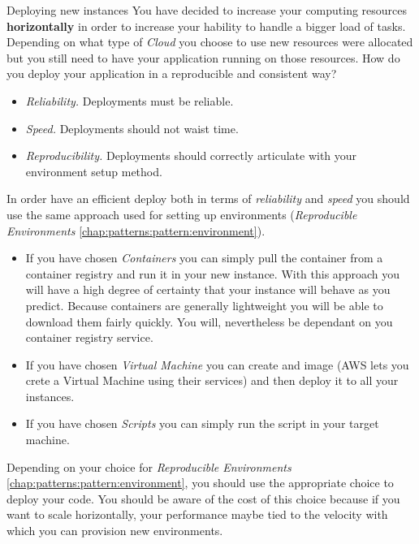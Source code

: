 \begin{pattern}{Deploying new instances}  \label{chap:patterns:pattern:deploying}
\context
You have decided to increase your computing resources \textbf{horizontally} in order to increase your hability to handle a bigger load of tasks. Depending on what type of \textit{Cloud} you choose to use new resources were allocated but you still need to have your application running on those resources.
\problem
How do you deploy your application in a reproducible and consistent way?

\forces
\begin{itemize}
        \item \textit{Reliability.} Deployments must be reliable.
        \item \textit{Speed.} Deployments should not waist time.
        \item \textit{Reproducibility.} Deployments should correctly articulate with your environment setup method.
\end{itemize}
\solution
In order have an efficient deploy both in terms of \textit{reliability} and \textit{speed} you should use the same approach used for setting up environments (\textit{Reproducible Environments} \ref{chap:patterns:pattern:environment}).
\begin{itemize}
        \item If you have chosen \textit{Containers} you can simply pull the container from a container registry and run it in your new instance. With this approach you will have a high degree of certainty that your instance will behave as you predict. Because containers are generally lightweight you will be able to download them fairly quickly. You will, nevertheless be dependant on you container registry service.
        \item If you have chosen \textit{Virtual Machine} you can create and image (AWS lets you crete a Virtual Machine using their services) and then deploy it to all your instances.
        \item If you have chosen \textit{Scripts} you can simply run the script in your target machine.
\end{itemize}
\related
Depending on your choice for \textit{Reproducible Environments} \ref{chap:patterns:pattern:environment}, you should use the appropriate choice to deploy your code. You should be aware of the cost of this choice because if you want to scale horizontally, your performance maybe tied to the velocity with which you can provision new environments.
\end{pattern}





